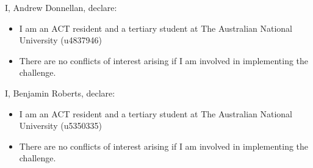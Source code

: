 \documentclass[12pt]{article}
\begin{document}
I, Andrew Donnellan, declare:
\begin{itemize}
\item I am an ACT resident and a tertiary student at The
  Australian National University (u4837946) \item There are no
  conflicts of interest arising if I am involved in implementing the
  challenge.
\end{itemize}


I, Benjamin Roberts, declare:
\begin{itemize}
\item I am an ACT resident and a tertiary student at The
  Australian National University (u5350335) \item There are no
  conflicts of interest arising if I am involved in implementing the
  challenge.
\end{itemize}
\end{document}
